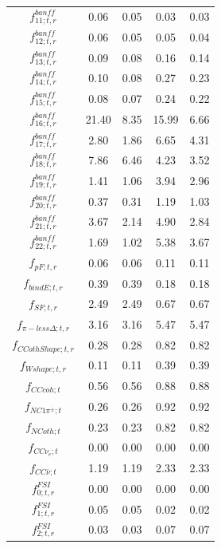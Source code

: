 \begin{table}
\begin{tabular}{| c || c | c || c | c |}
$f_{11; t, r}^{banff}$        & 0.06 & 0.05 & 0.03 & 0.03 \\
$f_{12; t, r}^{banff}$        & 0.06 & 0.05 & 0.05 & 0.04 \\
$f_{13; t, r}^{banff}$        & 0.09 & 0.08 & 0.16 & 0.14 \\
$f_{14; t, r}^{banff}$        & 0.10 & 0.08 & 0.27 & 0.23 \\
$f_{15; t, r}^{banff}$        & 0.08 & 0.07 & 0.24 & 0.22 \\
$f_{16; t, r}^{banff}$        &21.40 & 8.35 &15.99 & 6.66 \\
$f_{17; t, r}^{banff}$        & 2.80 & 1.86 & 6.65 & 4.31 \\
$f_{18; t, r}^{banff}$        & 7.86 & 6.46 & 4.23 & 3.52 \\
$f_{19; t, r}^{banff}$        & 1.41 & 1.06 & 3.94 & 2.96 \\
$f_{20; t, r}^{banff}$        & 0.37 & 0.31 & 1.19 & 1.03 \\
$f_{21; t, r}^{banff}$        & 3.67 & 2.14 & 4.90 & 2.84 \\
$f_{22; t, r}^{banff}$        & 1.69 & 1.02 & 5.38 & 3.67 \\
\hline
$f_{pF; t, r}$                & 0.06 & 0.06 & 0.11 & 0.11 \\
$f_{bindE; t, r}$             & 0.39 & 0.39 & 0.18 & 0.18 \\
$f_{SF; t, r}$                & 2.49 & 2.49 & 0.67 & 0.67 \\
$f_{\pi-less\Delta; t, r}$    & 3.16 & 3.16 & 5.47 & 5.47 \\
$f_{CCothShape; t, r}$        & 0.28 & 0.28 & 0.82 & 0.82 \\
$f_{Wshape; t, r}$            & 0.11 & 0.11 & 0.39 & 0.39 \\
$f_{CCcoh; t}$                & 0.56 & 0.56 & 0.88 & 0.88 \\
$f_{NC1\pi^\pm; t}$           & 0.26 & 0.26 & 0.92 & 0.92 \\
$f_{NCoth; t}$                & 0.23 & 0.23 & 0.82 & 0.82 \\
$f_{CC\nu_e; t}$              & 0.00 & 0.00 & 0.00 & 0.00 \\
$f_{CC\bar{\nu}; t}$          & 1.19 & 1.19 & 2.33 & 2.33 \\
\hline
$f_{0; t, r}^{FSI}$           & 0.00 & 0.00 & 0.00 & 0.00 \\
$f_{1; t, r}^{FSI}$           & 0.05 & 0.05 & 0.02 & 0.02 \\
$f_{2; t, r}^{FSI}$           & 0.03 & 0.03 & 0.07 & 0.07 \\

\end{tabular}
\end{table}
